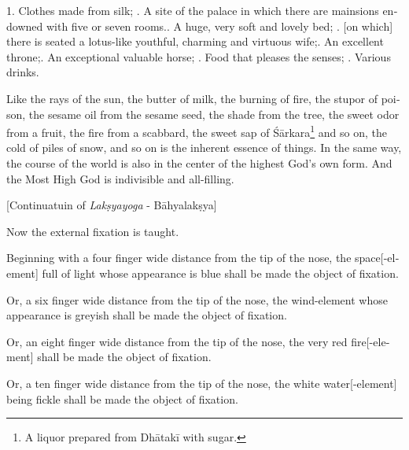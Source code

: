 \begin{otherlanguage}{english}
\begin{tlate}
\end{tlate}
\begin{tlate}
  1. Clothes made from silk; \hfill {}. A site of the palace in which there are mainsions endowned with five or seven rooms.\hfill {}. A huge, very soft and lovely bed; \hfill {}. [on which] there is seated a lotus-like youthful, charming and virtuous wife;\hfill {}. An excellent throne;\hfill {}. An exceptional valuable horse; \hfill {}. Food that pleases the senses; \hfill {}. Various drinks. \hfill \break 
\end{tlate}
\begin{tlate}
Like the rays of the sun, the butter of milk, the burning of fire, the stupor of poison, the sesame oil from the sesame seed, the shade from the tree, the sweet odor from a fruit, the fire from a scabbard, the sweet sap of Śārkara\footnote{A liquor prepared from Dhātakī with sugar.} and so on, the cold of piles of snow, and so on is the inherent essence of things. In the same way, the course of the world is also in the center of the highest God's own form. And the Most High God is indivisible and all-filling.
\end{tlate}
\begin{tlate}
   \bigskip
        \centerline{\textrm{\small{[Continuatuin of \textit{Lakṣyayoga} - Bāhyalakṣya]}}}
          \bigskip
Now the external fixation is taught.
\end{tlate}
\begin{tlate}
Beginning with a four finger wide distance from the tip of the nose, the space[-element] full of light whose appearance is blue shall be made the object of fixation.
\end{tlate}
\begin{tlate}
Or, a six finger wide distance from the tip of the nose, the wind-element whose appearance is greyish shall be made the object of fixation. 
\end{tlate}
\begin{tlate}
Or, an eight finger wide distance from the tip of the nose, the very red fire[-element] shall be made the object of fixation. 
\end{tlate}
\begin{tlate}
Or, a ten finger wide distance from the tip of the nose, the white water[-element] being fickle shall be made the object of fixation.

\end{tlate}
\end{otherlanguage}
